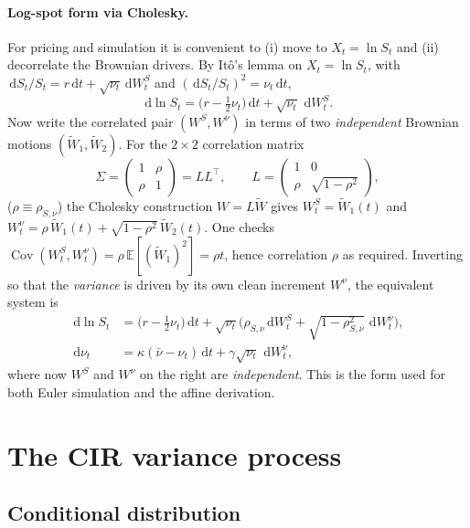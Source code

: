 \documentclass[11pt]{article}
\newcommand{\E}{\mathbb{E}}
\newcommand{\dd}{\,\mathrm{d}}
\begin{document}
\paragraph{Log-spot form via Cholesky.}
For pricing and simulation it is convenient to (i) move to $X_t=\ln S_t$ and (ii)
decorrelate the Brownian drivers. By It\^o's lemma on $X_t=\ln S_t$, with
$\dd S_t/S_t = r\dd t + \sqrt{\nu_t}\dd W^S_t$ and $(\dd S_t/S_t)^2=\nu_t\dd t$,
\begin{equation}
\dd \ln S_t = \Big(r - \tfrac12 \nu_t\Big)\dd t + \sqrt{\nu_t}\,\dd W^S_t.
\end{equation}
Now write the correlated pair $(W^S,W^\nu)$ in terms of two \emph{independent}
Brownian motions $(\widetilde W_1, \widetilde W_2)$. For the $2\times2$ correlation
matrix
\[
\Sigma = \begin{pmatrix} 1 & \rho \\ \rho & 1 \end{pmatrix}
= L L^\top,
\qquad
L = \begin{pmatrix} 1 & 0 \\ \rho & \sqrt{1-\rho^2}\end{pmatrix},
\]
($\rho\equiv\rho_{S,\nu}$) the Cholesky construction $W = L\widetilde W$ gives
$W^S_t = \widetilde W_1(t)$ and
$W^\nu_t = \rho\,\widetilde W_1(t) + \sqrt{1-\rho^2}\,\widetilde W_2(t)$.
One checks $\operatorname{Cov}(W^S_t,W^\nu_t)=\rho\,\E[(\widetilde W_1)^2]=\rho t$, hence
correlation $\rho$ as required. Inverting so that the \emph{variance} is driven by its
own clean increment $W^\nu$, the equivalent system is
\begin{align}
\dd \ln S_t &= \Big(r - \tfrac12\nu_t\Big)\dd t
+ \sqrt{\nu_t}\Big(\rho_{S,\nu}\dd W^S_t + \sqrt{1-\rho_{S,\nu}^2}\,\dd W^\nu_t\Big),\\
\dd \nu_t &= \kappa(\bar\nu-\nu_t)\dd t + \gamma\sqrt{\nu_t}\,\dd W^\nu_t,
\label{eq:hestonlog}
\end{align}
where now $W^S$ and $W^\nu$ on the right are \emph{independent}. This is the form used
for both Euler simulation and the affine derivation.

\section{The CIR variance process}

\subsection{Conditional distribution}
\end{document}
